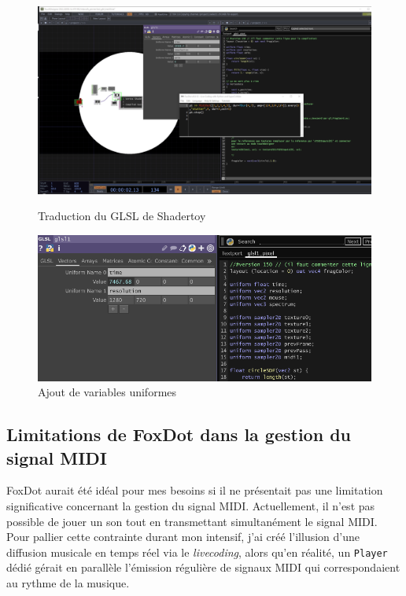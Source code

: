 \begin{figure}[h]
  \begin{minipage}[b]{0.45\linewidth}
    \centering
    \includegraphics[width=\linewidth]{images/experiments/intensifs/intensifs05.png} 
    \caption{Traduction du GLSL de Shadertoy}
    \label{intensifs05}
  \end{minipage}
  \hspace{0.1\linewidth} %
  \begin{minipage}[b]{0.45\linewidth}
    \centering
    \includegraphics[width=\linewidth]{images/experiments/intensifs/intensifs12.png}
    \caption{Ajout de variables uniformes}
    \label{intensifs12}
  \end{minipage}
\end{figure}


\subsection*{Limitations de FoxDot dans la gestion du signal MIDI}

FoxDot aurait été idéal pour mes besoins si il ne présentait pas une limitation significative concernant la gestion du signal MIDI. Actuellement, il n'est pas possible de jouer un son tout en transmettant simultanément le signal MIDI. Pour pallier cette contrainte durant mon intensif, j'ai créé l'illusion d'une diffusion musicale en temps réel via le \textit{livecoding}, alors qu'en réalité, un \lstinline{Player} dédié gérait en parallèle l'émission régulière de signaux MIDI qui correspondaient au rythme de la musique.

